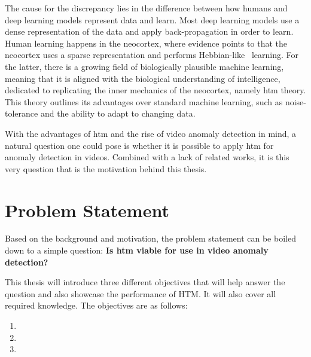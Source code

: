 \par
The cause for the discrepancy lies in the difference between how humans and deep learning models represent data and learn. Most deep learning models use a dense representation of the data and apply back-propagation in order to learn. Human learning happens in the neocortex, where evidence points to that the neocortex uses a sparse representation and performs Hebbian-like~\cite{hebbian_learning} learning. For the latter, there is a growing field of biologically plausible machine learning, meaning that it is aligned with the biological understanding of intelligence, dedicated to replicating the inner mechanics of the neocortex, namely  \gls*{htm} theory. This theory outlines its advantages over standard machine learning, such as noise-tolerance and the ability to adapt to changing data.
\par
With the advantages of  \gls*{htm} and the rise of video anomaly detection in mind, a natural question one could pose is whether it is possible to apply  \gls*{htm} for anomaly detection in videos. Combined with a lack of related works, it is this very question that is the motivation behind this thesis.

\section{Problem Statement}
\label{sec:problem_statement}
Based on the background and motivation, the problem statement can be boiled down to a simple question: \textbf{Is \gls*{htm} viable for use in video anomaly detection?}\par
This thesis will introduce three different objectives that will help answer the question and also showcase the performance of HTM. It will also cover all required knowledge. The objectives are as follows:
\begin{enumerate}
    \item {}
    \item {}
    \item {}
\end{enumerate}

